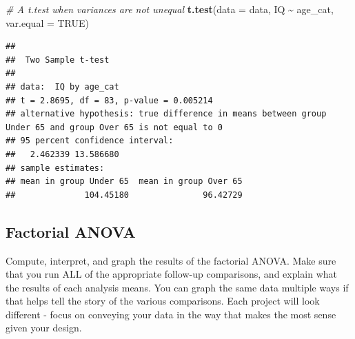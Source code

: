 \documentclass[
]{book}
\newenvironment{Shaded}{\begin{snugshade}}{\end{snugshade}}
\newcommand{\AttributeTok}[1]{\textcolor[rgb]{0.13,0.29,0.53}{#1}}
\newcommand{\CommentTok}[1]{\textcolor[rgb]{0.56,0.35,0.01}{\textit{#1}}}
\newcommand{\ConstantTok}[1]{\textcolor[rgb]{0.56,0.35,0.01}{#1}}
\newcommand{\FunctionTok}[1]{\textcolor[rgb]{0.13,0.29,0.53}{\textbf{#1}}}
\newcommand{\NormalTok}[1]{#1}
\newcommand{\SpecialCharTok}[1]{\textcolor[rgb]{0.81,0.36,0.00}{\textbf{#1}}}
\begin{document}
\begin{Shaded}
\begin{Highlighting}[]
\CommentTok{\# A t.test when variances are not unequal}
\FunctionTok{t.test}\NormalTok{(}\AttributeTok{data =}\NormalTok{ data, IQ }\SpecialCharTok{\textasciitilde{}}\NormalTok{ age\_cat, }\AttributeTok{var.equal =} \ConstantTok{TRUE}\NormalTok{)}
\end{Highlighting}
\end{Shaded}

\begin{verbatim}
## 
##  Two Sample t-test
## 
## data:  IQ by age_cat
## t = 2.8695, df = 83, p-value = 0.005214
## alternative hypothesis: true difference in means between group Under 65 and group Over 65 is not equal to 0
## 95 percent confidence interval:
##   2.462339 13.586680
## sample estimates:
## mean in group Under 65  mean in group Over 65 
##              104.45180               96.42729
\end{verbatim}

\subsection*{Factorial ANOVA}\label{factorial-anova}

Compute, interpret, and graph the results of the factorial ANOVA. Make sure that you run ALL of the appropriate follow-up comparisons, and explain what the results of each analysis means. You can graph the same data multiple ways if that helps tell the story of the various comparisons. Each project will look different - focus on conveying your data in the way that makes the most sense given your design.
\end{document}

